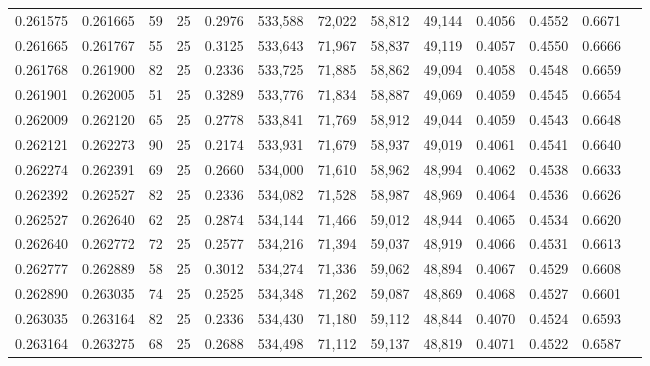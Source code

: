 \begin{tabular}{rrrrrrrrrrrrr}
0.261575 & 0.261665 &    59 &  25 &                                     0.2976 & 533,588 &  72,022 &  58,812 &  49,144 & 0.4056 & 0.4552 & 0.6671 \\
0.261665 & 0.261767 &    55 &  25 &                                     0.3125 & 533,643 &  71,967 &  58,837 &  49,119 & 0.4057 & 0.4550 & 0.6666 \\
0.261768 & 0.261900 &    82 &  25 &                                     0.2336 & 533,725 &  71,885 &  58,862 &  49,094 & 0.4058 & 0.4548 & 0.6659 \\
0.261901 & 0.262005 &    51 &  25 &                                     0.3289 & 533,776 &  71,834 &  58,887 &  49,069 & 0.4059 & 0.4545 & 0.6654 \\
0.262009 & 0.262120 &    65 &  25 &                                     0.2778 & 533,841 &  71,769 &  58,912 &  49,044 & 0.4059 & 0.4543 & 0.6648 \\
0.262121 & 0.262273 &    90 &  25 &                                     0.2174 & 533,931 &  71,679 &  58,937 &  49,019 & 0.4061 & 0.4541 & 0.6640 \\
0.262274 & 0.262391 &    69 &  25 &                                     0.2660 & 534,000 &  71,610 &  58,962 &  48,994 & 0.4062 & 0.4538 & 0.6633 \\
0.262392 & 0.262527 &    82 &  25 &                                     0.2336 & 534,082 &  71,528 &  58,987 &  48,969 & 0.4064 & 0.4536 & 0.6626 \\
0.262527 & 0.262640 &    62 &  25 &                                     0.2874 & 534,144 &  71,466 &  59,012 &  48,944 & 0.4065 & 0.4534 & 0.6620 \\
0.262640 & 0.262772 &    72 &  25 &                                     0.2577 & 534,216 &  71,394 &  59,037 &  48,919 & 0.4066 & 0.4531 & 0.6613 \\
0.262777 & 0.262889 &    58 &  25 &                                     0.3012 & 534,274 &  71,336 &  59,062 &  48,894 & 0.4067 & 0.4529 & 0.6608 \\
0.262890 & 0.263035 &    74 &  25 &                                     0.2525 & 534,348 &  71,262 &  59,087 &  48,869 & 0.4068 & 0.4527 & 0.6601 \\
0.263035 & 0.263164 &    82 &  25 &                                     0.2336 & 534,430 &  71,180 &  59,112 &  48,844 & 0.4070 & 0.4524 & 0.6593 \\
0.263164 & 0.263275 &    68 &  25 &                                     0.2688 & 534,498 &  71,112 &  59,137 &  48,819 & 0.4071 & 0.4522 & 0.6587 \\

\end{tabular}
